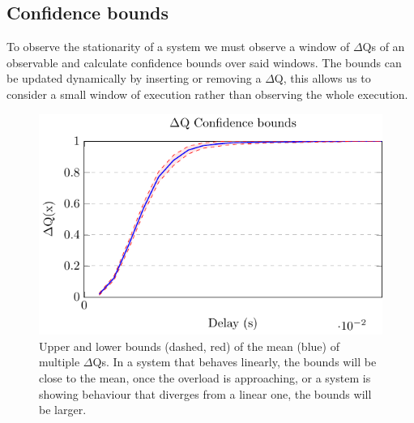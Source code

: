     \subsection{Confidence bounds}
    To observe the stationarity of a system we must observe a window of $\Delta$Qs of an observable and calculate confidence bounds over said windows. The bounds can be updated dynamically by inserting or removing a $\Delta$Q, this allows us to consider a small window of execution rather than observing the whole execution.
        \begin{figure}[H]
            \begin{center}
                \includegraphics[scale=1]{tikz/ci.pdf} 
            \end{center}
            \caption{Upper and lower bounds (dashed, red) of the mean (blue) of multiple $\Delta$Qs. In a system that behaves linearly, the bounds will be close to the mean, once the overload is approaching, or a system is showing behaviour that diverges from a linear one, the bounds will be larger.}
        \end{figure}

  

